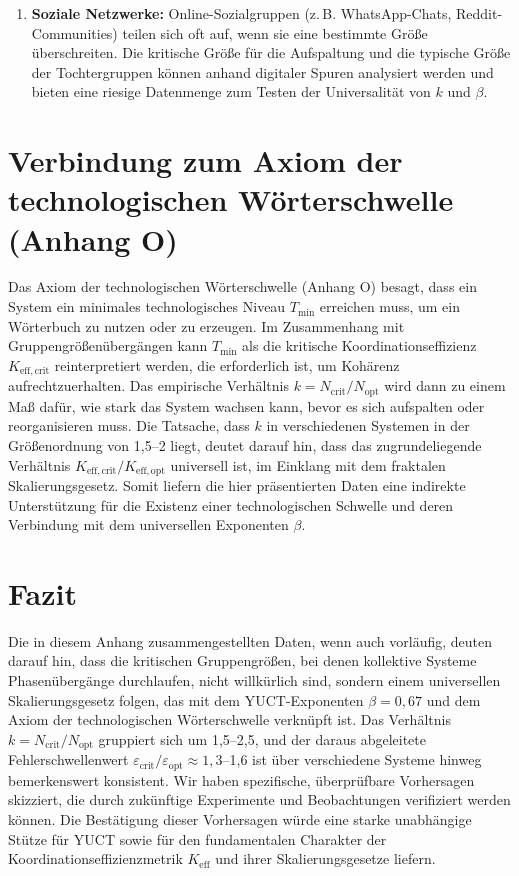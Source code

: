 \documentclass[12pt]{article}
\theoremstyle{remark}
\newcommand{\Keff}{K_{\mathrm{eff}}}
\newcommand{\Tmin}{T_{\min}}
\begin{document}
\begin{enumerate}
		\item \textbf{Soziale Netzwerke:} Online-Sozialgruppen (z. B. WhatsApp-Chats, Reddit-Communities) teilen sich oft auf, wenn sie eine bestimmte Größe überschreiten. Die kritische Größe für die Aufspaltung und die typische Größe der Tochtergruppen können anhand digitaler Spuren analysiert werden und bieten eine riesige Datenmenge zum Testen der Universalität von $k$ und $\beta$.
	\end{enumerate}
	
	\section{Verbindung zum Axiom der technologischen Wörterschwelle (Anhang O)}
	\label{sec:connection}
	
	Das Axiom der technologischen Wörterschwelle (Anhang O) besagt, dass ein System ein minimales technologisches Niveau $\Tmin$ erreichen muss, um ein Wörterbuch zu nutzen oder zu erzeugen. Im Zusammenhang mit Gruppengrößenübergängen kann $\Tmin$ als die kritische Koordinationseffizienz $K_{\mathrm{eff},\text{crit}}$ reinterpretiert werden, die erforderlich ist, um Kohärenz aufrechtzuerhalten. Das empirische Verhältnis $k = N_{\text{crit}}/N_{\text{opt}}$ wird dann zu einem Maß dafür, wie stark das System wachsen kann, bevor es sich aufspalten oder reorganisieren muss. Die Tatsache, dass $k$ in verschiedenen Systemen in der Größenordnung von 1,5–2 liegt, deutet darauf hin, dass das zugrundeliegende Verhältnis $K_{\mathrm{eff},\text{crit}}/K_{\mathrm{eff},\text{opt}}$ universell ist, im Einklang mit dem fraktalen Skalierungsgesetz. Somit liefern die hier präsentierten Daten eine indirekte Unterstützung für die Existenz einer technologischen Schwelle und deren Verbindung mit dem universellen Exponenten $\beta$.
	
	\section{Fazit}
	\label{sec:conclusion}
	
	Die in diesem Anhang zusammengestellten Daten, wenn auch vorläufig, deuten darauf hin, dass die kritischen Gruppengrößen, bei denen kollektive Systeme Phasenübergänge durchlaufen, nicht willkürlich sind, sondern einem universellen Skalierungsgesetz folgen, das mit dem YUCT-Exponenten $\beta = 0,67$ und dem Axiom der technologischen Wörterschwelle verknüpft ist. Das Verhältnis $k = N_{\text{crit}}/N_{\text{opt}}$ gruppiert sich um 1,5–2,5, und der daraus abgeleitete Fehlerschwellenwert $\varepsilon_{\text{crit}}/\varepsilon_{\text{opt}} \approx 1,3$–1,6 ist über verschiedene Systeme hinweg bemerkenswert konsistent. Wir haben spezifische, überprüfbare Vorhersagen skizziert, die durch zukünftige Experimente und Beobachtungen verifiziert werden können. Die Bestätigung dieser Vorhersagen würde eine starke unabhängige Stütze für YUCT sowie für den fundamentalen Charakter der Koordinationseffizienzmetrik $\Keff$ und ihrer Skalierungsgesetze liefern.
	
\end{document}
